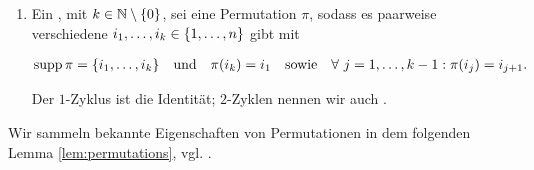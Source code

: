 \begin{definition}
\begin{enumerate}[label = \arabic*.]
                     den Träger einer Permutation $\pi \in S_n$.
                    \Glspl{glos:disjoint_permutation} $\pi_1, \pi_2 \in S_n$ haben disjunkte Träger $\supp \pi_1$ und $\supp \pi_1$.
        
                    \item Ein , mit $k \in \mathbb N \setminus {\left \{ 0 \right \}}$, sei eine Permutation $\pi$, sodass es paarweise verschiedene $i_1, \dots, i_k \in {\left \{ 1, \dots, n \right \}}$ gibt mit
        
                    \begin{align*}
                        \operatorname{supp} \pi = {\left \{ i_1, \dots, i_k \right \}}
                        \quad
                        \text{und}
                        \quad
                        \pi(i_k) = i_1
                        \quad
                        \text{sowie}
                        \quad
                        \forall ~ j = 1, \dots, k-1:
                            \pi(i_j) = i_{j+1}.
                    \end{align*}
        
                    Der $1$-Zyklus ist die Identität;
                    $2$-Zyklen nennen wir auch .
    
                \end{enumerate}

            \end{definition}

            Wir sammeln bekannte Eigenschaften von Permutationen in dem folgenden Lemma \ref{lem:permutations}, vgl. \cite[Kapitel 1.13]{LinAG1&2}.

